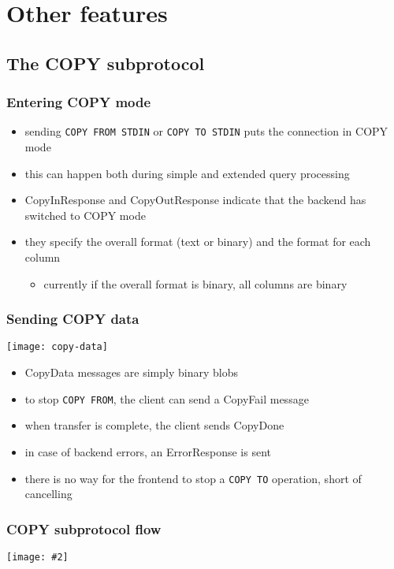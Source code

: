 \documentclass{beamer}
\newcommand{\mscdiagram}[2][1]{
  \begin{center}
    \texttt{[image: \#2]}
  \end{center}
}
\begin{document}
\section{Other features}
\subsection{The COPY subprotocol}

\begin{frame}
  \frametitle{Entering COPY mode}

  \begin{itemize}
  \item sending \texttt{COPY FROM STDIN} or \texttt{COPY TO STDIN} puts the
    connection in COPY mode
  \item this can happen both during simple and extended query processing
  \item CopyInResponse and CopyOutResponse indicate that the backend has
    switched to COPY mode
  \item they specify the overall format (text or binary) and the format for
    each column
    \begin{itemize}
    \item currently if the overall format is binary, all columns are binary
    \end{itemize}
  \end{itemize}
\end{frame}

\begin{frame}
  \frametitle{Sending COPY data}

  \begin{center}
    \texttt{[image: copy-data]}
  \end{center}

  \begin{itemize}
  \item CopyData messages are simply binary blobs
  \item to stop \texttt{COPY FROM}, the client can send a CopyFail message
  \item when transfer is complete, the client sends CopyDone
  \item in case of backend errors, an ErrorResponse is sent
  \item there is no way for the frontend to stop a \texttt{COPY TO} operation,
    short of cancelling
  \end{itemize}
\end{frame}

\begin{frame}
  \frametitle{COPY subprotocol flow}

  \mscdiagram{copy-flow}
\end{frame}
\end{document}
